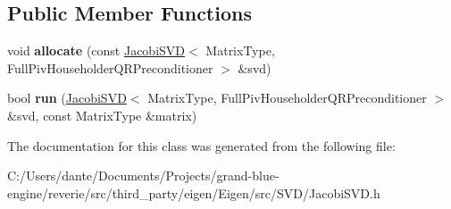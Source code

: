 \subsection*{Public Member Functions}
\begin{DoxyCompactItemize}
\item 
\mbox{\label{class_eigen_1_1internal_1_1qr__preconditioner__impl_3_01_matrix_type_00_01_full_piv_householder_b68efcf0da0383d73ce7fb20aafa2293_aaf51bc2637a96e8069128f3ee9eb1726}} 
void {\bfseries allocate} (const \mbox{\hyperlink{class_eigen_1_1_jacobi_s_v_d}{Jacobi\+S\+VD}}$<$ Matrix\+Type, Full\+Piv\+Householder\+Q\+R\+Preconditioner $>$ \&svd)
\item 
\mbox{\label{class_eigen_1_1internal_1_1qr__preconditioner__impl_3_01_matrix_type_00_01_full_piv_householder_b68efcf0da0383d73ce7fb20aafa2293_ab9e7960349091e9d4c44b9a0a31b0931}} 
bool {\bfseries run} (\mbox{\hyperlink{class_eigen_1_1_jacobi_s_v_d}{Jacobi\+S\+VD}}$<$ Matrix\+Type, Full\+Piv\+Householder\+Q\+R\+Preconditioner $>$ \&svd, const Matrix\+Type \&matrix)
\end{DoxyCompactItemize}


The documentation for this class was generated from the following file\+:\begin{DoxyCompactItemize}
\item 
C\+:/\+Users/dante/\+Documents/\+Projects/grand-\/blue-\/engine/reverie/src/third\+\_\+party/eigen/\+Eigen/src/\+S\+V\+D/Jacobi\+S\+V\+D.\+h\end{DoxyCompactItemize}
